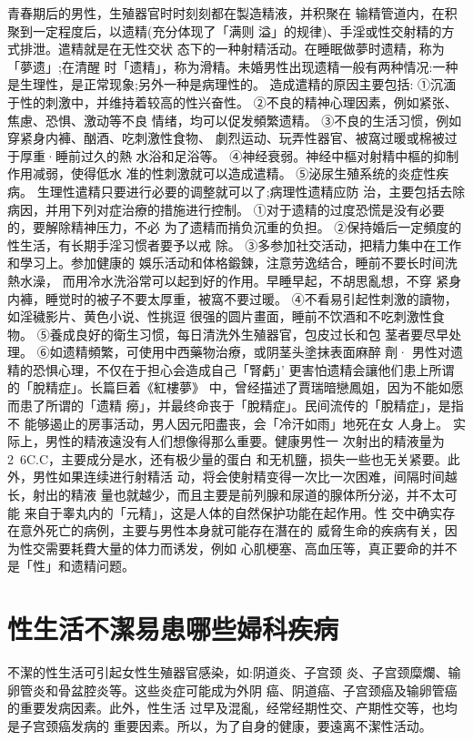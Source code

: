 \documentclass[12pt,UTF8]{ctexbook}
\begin{document}
青春期后的男性，生殖器官时时刻刻都在製造精液，并积聚在
输精管道内，在积聚到一定程度后，以遗精(充分体现了「满则
溢」的规律)、手淫或性交射精的方式排泄。遣精就是在无性交状
态下的一种射精活动。在睡眠做夢时遗精，称为「夢遗」;在清醒
时「遗精」，称为滑精。未婚男性出现遗精一般有两种情况:一种
是生理性，是正常现象;另外一种是病理性的。
造成遣精的原因主要包括:
①沉湎于性的刺激中，并维持着较高的性兴奋性。
②不良的精神心理因素，例如紧张、焦慮、恐惧、激动等不良
情绪，均可以促发頻繁遗精。
③不良的生活习惯，例如穿紧身内褲、酗酒、吃刺激性食物、
劇烈运动、玩弄性器官、被窩过暖或棉被过于厚重·睡前过久的熱
水浴和足浴等。
④神经衰弱。神经中樞对射精中樞的抑制作用减弱，使得低水
准的性刺激就可以造成遣精。
⑤泌尿生殖系统的炎症性疾病。
生理性遣精只要进行必要的调整就可以了;病理性遗精应防
治，主要包括去除病因，并用下列对症治療的措施进行控制。
①对于遗精的过度恐慌是没有必要的，要解除精神压力，不必
为了遗精而掯负沉重的负担。
②保持婚后一定頻度的性生活，有长期手淫习惯者要予以戒
除。
③多参加社交活动，把精力集中在工作和學习上。参加健康的
娛乐活动和体格鍛鍊，注意劳逸结合，睡前不要长时间洗熱水澡，
而用冷水洗浴常可以起到好的作用。早睡早起，不胡思亂想，不穿
紧身内褲，睡觉时的被子不要太厚重，被窩不要过暖。
④不看易引起性刺激的讀物，如淫穢影片、黄色小说、性挑逗
很强的圆片畫面，睡前不饮酒和不吃刺激性食物。
⑤養成良好的衛生习惯，每日清洗外生殖器官，包皮过长和包
茎者要尽早处理。
⑥如遗精頻繁，可使用中西藥物治療，或阴茎头塗抹表面麻醉
劑·
男性对遗精的恐惧心理，不仅在于担心会造成自己「腎虧」’
更害怕遗精会讓他们患上所谓的「脫精症」。长篇巨着《紅樓夢》
中，曾经描述了賈瑞暗戀鳳姐，因为不能如愿而患了所谓的「遗精
癆」，并最终命丧于「脫精症」。民间流传的「脫精症」，是指不
能够遏止的房事活动，男人因元阳盡丧，会「冷汗如雨」地死在女
人身上。
实际上，男性的精液遠没有人们想像得那么重要。健康男性一
次射出的精液量为2~6C.C，主要成分是水，还有极少量的蛋白
和无机鹽，损失一些也无关紧要。此外，男性如果连续进行射精活
动，将会使射精变得一次比一次困难，间隔时间越长，射出的精液
量也就越少，而且主要是前列腺和尿道的腺体所分泌，并不太可能
来自于睾丸内的「元精」，这是人体的自然保护功能在起作用。性
交中确实存在意外死亡的病例，主要与男性本身就可能存在潛在的
威脅生命的疾病有关，因为性交需要耗費大量的体力而诱发，例如
心肌梗塞、高血压等，真正要命的并不是「性」和遗精问题。

\section{性生活不潔易患哪些婦科疾病}

不潔的性生活可引起女性生殖器官感染，如:阴道炎、子宫颈
炎、子宫颈糜爛、输卵管炎和骨盆腔炎等。这些炎症可能成为外阴
癌、阴道癌、子宫颈癌及输卵管癌的重要发病因素。此外，性生活
过早及混亂，经常经期性交、产期性交等，也均是子宫颈癌发病的
重要因素。所以，为了自身的健康，要遠离不潔性活动。
\end{document}
